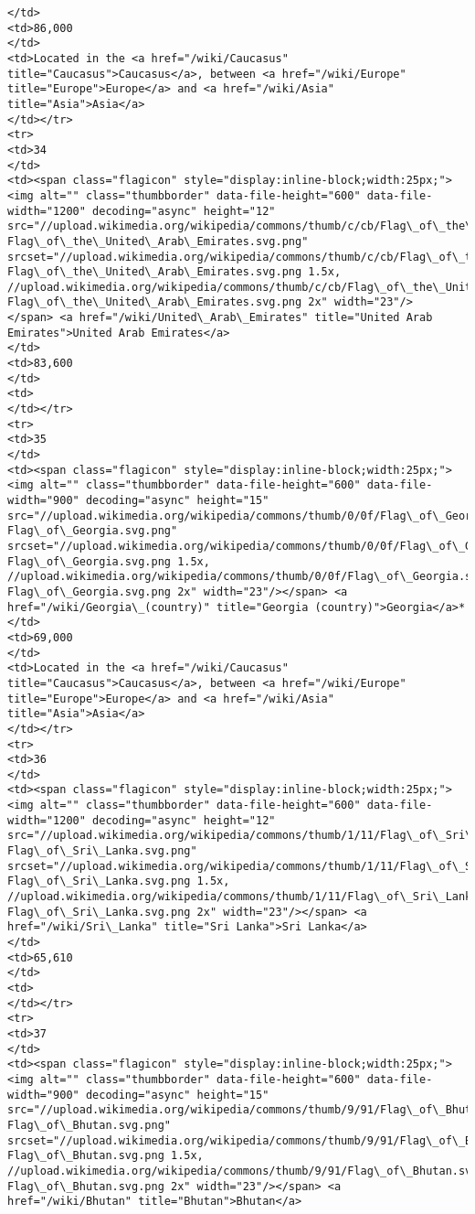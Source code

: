 \documentclass[11pt]{article}
\begin{document}
\begin{Verbatim}[commandchars=\\\{\}]
</td>
<td>86,000
</td>
<td>Located in the <a href="/wiki/Caucasus" title="Caucasus">Caucasus</a>, between <a href="/wiki/Europe" title="Europe">Europe</a> and <a href="/wiki/Asia" title="Asia">Asia</a>
</td></tr>
<tr>
<td>34
</td>
<td><span class="flagicon" style="display:inline-block;width:25px;"><img alt="" class="thumbborder" data-file-height="600" data-file-width="1200" decoding="async" height="12" src="//upload.wikimedia.org/wikipedia/commons/thumb/c/cb/Flag\_of\_the\_United\_Arab\_Emirates.svg/23px-Flag\_of\_the\_United\_Arab\_Emirates.svg.png" srcset="//upload.wikimedia.org/wikipedia/commons/thumb/c/cb/Flag\_of\_the\_United\_Arab\_Emirates.svg/35px-Flag\_of\_the\_United\_Arab\_Emirates.svg.png 1.5x, //upload.wikimedia.org/wikipedia/commons/thumb/c/cb/Flag\_of\_the\_United\_Arab\_Emirates.svg/46px-Flag\_of\_the\_United\_Arab\_Emirates.svg.png 2x" width="23"/></span> <a href="/wiki/United\_Arab\_Emirates" title="United Arab Emirates">United Arab Emirates</a>
</td>
<td>83,600
</td>
<td>
</td></tr>
<tr>
<td>35
</td>
<td><span class="flagicon" style="display:inline-block;width:25px;"><img alt="" class="thumbborder" data-file-height="600" data-file-width="900" decoding="async" height="15" src="//upload.wikimedia.org/wikipedia/commons/thumb/0/0f/Flag\_of\_Georgia.svg/23px-Flag\_of\_Georgia.svg.png" srcset="//upload.wikimedia.org/wikipedia/commons/thumb/0/0f/Flag\_of\_Georgia.svg/35px-Flag\_of\_Georgia.svg.png 1.5x, //upload.wikimedia.org/wikipedia/commons/thumb/0/0f/Flag\_of\_Georgia.svg/45px-Flag\_of\_Georgia.svg.png 2x" width="23"/></span> <a href="/wiki/Georgia\_(country)" title="Georgia (country)">Georgia</a>*
</td>
<td>69,000
</td>
<td>Located in the <a href="/wiki/Caucasus" title="Caucasus">Caucasus</a>, between <a href="/wiki/Europe" title="Europe">Europe</a> and <a href="/wiki/Asia" title="Asia">Asia</a>
</td></tr>
<tr>
<td>36
</td>
<td><span class="flagicon" style="display:inline-block;width:25px;"><img alt="" class="thumbborder" data-file-height="600" data-file-width="1200" decoding="async" height="12" src="//upload.wikimedia.org/wikipedia/commons/thumb/1/11/Flag\_of\_Sri\_Lanka.svg/23px-Flag\_of\_Sri\_Lanka.svg.png" srcset="//upload.wikimedia.org/wikipedia/commons/thumb/1/11/Flag\_of\_Sri\_Lanka.svg/35px-Flag\_of\_Sri\_Lanka.svg.png 1.5x, //upload.wikimedia.org/wikipedia/commons/thumb/1/11/Flag\_of\_Sri\_Lanka.svg/46px-Flag\_of\_Sri\_Lanka.svg.png 2x" width="23"/></span> <a href="/wiki/Sri\_Lanka" title="Sri Lanka">Sri Lanka</a>
</td>
<td>65,610
</td>
<td>
</td></tr>
<tr>
<td>37
</td>
<td><span class="flagicon" style="display:inline-block;width:25px;"><img alt="" class="thumbborder" data-file-height="600" data-file-width="900" decoding="async" height="15" src="//upload.wikimedia.org/wikipedia/commons/thumb/9/91/Flag\_of\_Bhutan.svg/23px-Flag\_of\_Bhutan.svg.png" srcset="//upload.wikimedia.org/wikipedia/commons/thumb/9/91/Flag\_of\_Bhutan.svg/35px-Flag\_of\_Bhutan.svg.png 1.5x, //upload.wikimedia.org/wikipedia/commons/thumb/9/91/Flag\_of\_Bhutan.svg/45px-Flag\_of\_Bhutan.svg.png 2x" width="23"/></span> <a href="/wiki/Bhutan" title="Bhutan">Bhutan</a>

\end{Verbatim}
\end{document}
